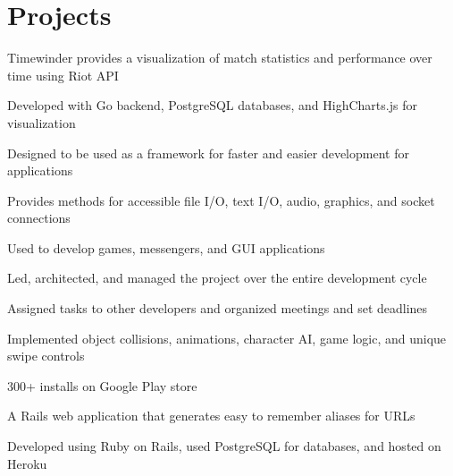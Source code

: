 \documentclass[]{peter_resume}
\begin{document}
\begin{minipage}[t]{0.66\textwidth}

\section{Projects}

\begin{tightemize}
\item Timewinder provides a visualization of match statistics and performance over time using Riot API
\item Developed with Go backend, PostgreSQL databases, and HighCharts.js for visualization
\end{tightemize} 
\sectionsep

\begin{tightemize}
\item Designed to be used as a framework for faster and easier development for applications
\item Provides methods for accessible file I/O, text I/O, audio, graphics, and socket connections
\item Used to develop games, messengers, and GUI applications
\end{tightemize}
\sectionsep

\begin{tightemize}
\item Led, architected, and managed the project over the entire development cycle
\item Assigned tasks to other developers and organized meetings and set deadlines
\item Implemented object collisions, animations, character AI, game logic, and unique swipe controls
\item 300+ installs on Google Play store
\end{tightemize} 
\sectionsep

\begin{tightemize}
\item A Rails web application that generates easy to remember aliases for URLs
\item Developed using Ruby on Rails, used PostgreSQL for databases, and hosted on Heroku
\end{tightemize}
\sectionsep


\end{minipage}
\end{document}
